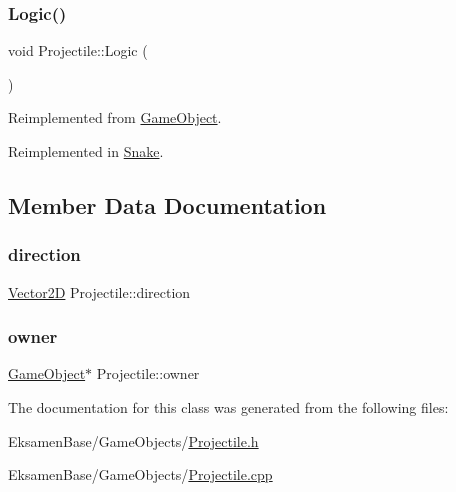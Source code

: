 \mbox{\label{class_projectile_a871e265207d2bf2d5180152a7acf2d40}} 
\subsubsection{\texorpdfstring{Logic()}{Logic()}}
{\footnotesize\ttfamily void Projectile\+::\+Logic (\begin{DoxyParamCaption}{ }\end{DoxyParamCaption})\hspace{0.3cm}{\ttfamily [virtual]}}



Reimplemented from \mbox{\hyperlink{class_game_object_a79510ffc77339fe850491dce9f580fa9}{Game\+Object}}.



Reimplemented in \mbox{\hyperlink{class_snake_a1f01e21a73734f9c0d701ec02a9d2e41}{Snake}}.



\subsection{Member Data Documentation}
\mbox{\label{class_projectile_a0e4b335bd16e41ec9f8b2f6b8006cac8}} 
\subsubsection{\texorpdfstring{direction}{direction}}
{\footnotesize\ttfamily \mbox{\hyperlink{struct_game_object_1_1_vector2_d}{Vector2D}} Projectile\+::direction\hspace{0.3cm}{\ttfamily [protected]}}

\mbox{\label{class_projectile_a1a76b3677c7be9a072e7097c34adc517}} 
\subsubsection{\texorpdfstring{owner}{owner}}
{\footnotesize\ttfamily \mbox{\hyperlink{class_game_object}{Game\+Object}}$\ast$ Projectile\+::owner\hspace{0.3cm}{\ttfamily [protected]}}



The documentation for this class was generated from the following files\+:\begin{DoxyCompactItemize}
\item 
Eksamen\+Base/\+Game\+Objects/\mbox{\hyperlink{_projectile_8h}{Projectile.\+h}}\item 
Eksamen\+Base/\+Game\+Objects/\mbox{\hyperlink{_projectile_8cpp}{Projectile.\+cpp}}\end{DoxyCompactItemize}
